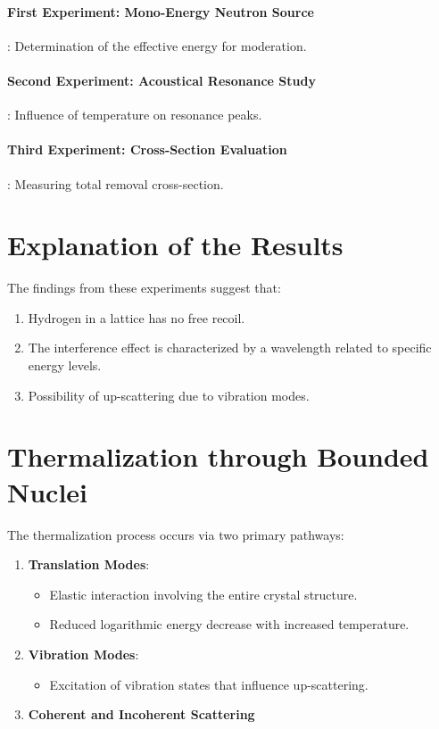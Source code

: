 \paragraph{First Experiment: Mono-Energy Neutron Source}: Determination of the effective energy for moderation. \\
\paragraph{Second Experiment: Acoustical Resonance Study}: Influence of temperature on resonance peaks. \\
\paragraph{Third Experiment: Cross-Section Evaluation}: Measuring total removal cross-section.

\section{Explanation of the Results}

The findings from these experiments suggest that:
\begin{enumerate}
    \item Hydrogen in a lattice has no free recoil.
    \item The interference effect is characterized by a wavelength related to specific energy levels.
    \item Possibility of up-scattering due to vibration modes.
\end{enumerate}

\section{Thermalization through Bounded Nuclei}

The thermalization process occurs via two primary pathways:
\begin{enumerate}
    \item \textbf{Translation Modes}:
        \begin{itemize}
            \item Elastic interaction involving the entire crystal structure.
            \item Reduced logarithmic energy decrease with increased temperature.
        \end{itemize}
    \item \textbf{Vibration Modes}:
        \begin{itemize}
            \item Excitation of vibration states that influence up-scattering.
        \end{itemize}
    \item \textbf{Coherent and Incoherent Scattering}
\end{enumerate}

